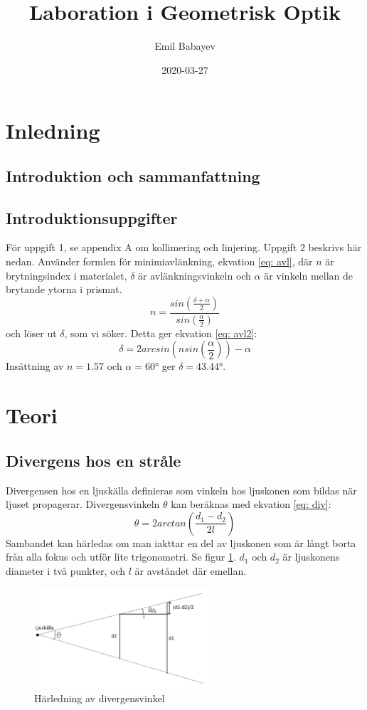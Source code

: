 \documentclass[a4paper]{article}
\title{Laboration i Geometrisk Optik}
\author{Emil Babayev}
\date{2020-03-27}
\begin{document}
\maketitle

\section{Inledning}
\subsection{Introduktion och sammanfattning}

\subsection{Introduktionsuppgifter}
För uppgift 1, se appendix A om kollimering och linjering. 
Uppgift 2 beskrivs här nedan.
Använder formlen för minimiavlänkning, ekvation \ref{eq: avl}, där $n$ är brytningsindex i materialet, $\delta$ är avlänkningsvinkeln och 
$\alpha$ är vinkeln mellan de brytande ytorna i prismat.
\begin{equation}
    \label{eq: avl}
    n = \frac{sin(\frac{\delta +\alpha}{2})}{sin(\frac{\alpha}{2})}
\end{equation}
och löser ut $\delta$, som vi söker. Detta ger ekvation \ref{eq: avl2}:
\begin{equation}
    \label{eq: avl2}
    \delta = 2 arcsin(n sin(\frac{\alpha}{2})) - \alpha
\end{equation}
Insättning av $n=1.57$ och $\alpha = \ang{60}$ ger $\delta = \ang{43.44}$.

\section{Teori}
\subsection{Divergens hos en stråle}
Divergensen hos en ljuskälla definieras som vinkeln hos ljuskonen som bildas när ljuset propagerar. Divergensvinkeln $\theta$ kan beräknas med ekvation \ref{eq: div}:
\begin{equation}
    \theta = 2 arctan(\frac{d_1 - d_2}{2l})
    \label{eq: div}
\end{equation}
Sambandet kan härledas om man iakttar en del av ljuskonen som är långt borta från alla fokus och utför lite trigonometri. Se figur \ref{fig:divergens}. $d_1$ och $d_2$
är ljuskonens diameter i två punkter, och $l$ är avståndet där emellan.  
\begin{figure}[h!]
    \includegraphics[width=0.6\textwidth]{divergens}
    \caption{Härledning av divergensvinkel}
    \label{fig:divergens}
\end{figure}
\pagebreak
\end{document}
